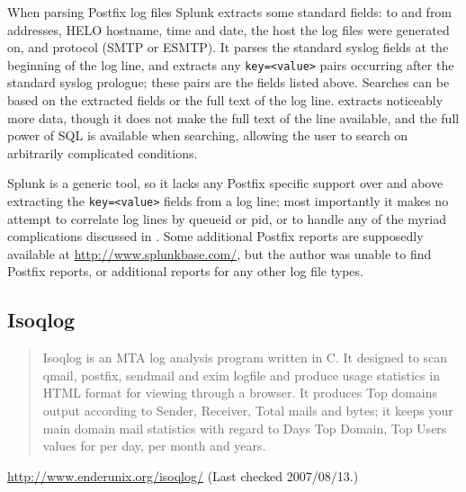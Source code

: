 When parsing Postfix log files Splunk extracts some standard fields: to and
from addresses, HELO hostname, time and date, the host the log files were
generated on, and protocol (\gls{SMTP} or \gls{ESMTP}).  It parses the
standard syslog fields at the beginning of the log line, and
extracts any \texttt{key=<value>} pairs occurring after the standard syslog
prologue; these pairs are the fields listed above.  Searches can be based
on the extracted fields or the full text of the log line.  \parsername{}
extracts noticeably more data, though it does not make the full text of the
line available, and the full power of \gls{SQL} is available when
searching, allowing the user to search on arbitrarily complicated
conditions.

Splunk is a generic tool, so it lacks any Postfix specific support over and
above extracting the \texttt{key=<value>} fields from a log line; most
importantly it makes no attempt to correlate log lines by queueid or
\gls{pid}, or to handle any of the myriad complications discussed in
.  Some additional Postfix reports are supposedly
available at \url{http://www.splunkbase.com/}, but the author was unable to
find Postfix reports, or additional reports for any other log file types.

\subsection{Isoqlog}

\begin{quotation}

    Isoqlog is an MTA log analysis program written in C. It designed to
    scan qmail, postfix, sendmail and exim logfile and produce usage
    statistics in HTML format for viewing through a browser. It produces
    Top domains output according to Sender, Receiver, Total mails and
    bytes; it keeps your main domain mail statistics with regard to Days
    Top Domain, Top Users values for per day, per month and years.

\end{quotation}

\noindent{}\url{http://www.enderunix.org/isoqlog/} \newline{}
(Last checked 2007/08/13.)

